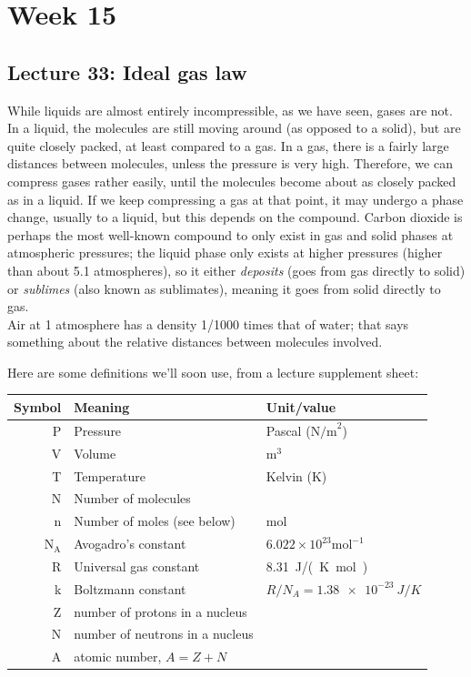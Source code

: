 \documentclass[8.01x]{subfiles}
\begin{document}
\chapter{Week 15}

\section{Lecture 33: Ideal gas law}

While liquids are almost entirely incompressible, as we have seen, gases are not. In a liquid, the molecules are still moving around (as opposed to a solid), but are quite closely packed, at least compared to a gas. In a gas, there is a fairly large distances between molecules, unless the pressure is very high. Therefore, we can compress gases rather easily, until the molecules become about as closely packed as in a liquid. If we keep compressing a gas at that point, it may undergo a phase change, usually to a liquid, but this depends on the compound. Carbon dioxide is perhaps the most well-known compound to only exist in gas and solid phases at atmospheric pressures; the liquid phase only exists at higher pressures (higher than about 5.1 atmospheres), so it either \emph{deposits} (goes from gas directly to solid) or \emph{sublimes} (also known as sublimates), meaning it goes from solid directly to gas.\\
Air at 1 atmosphere has a density 1/1000 times that of water; that says something about the relative distances between molecules involved.

Here are some definitions we'll soon use, from a lecture supplement sheet:

\begin{center}
\begin{tabular}{|r|l|l|}
\hline
Symbol & Meaning & Unit/value\\ \hline
P & Pressure & Pascal ($\text{N/m}^2$)\\
V & Volume & $\text{m}^3$\\
T & Temperature & Kelvin (K)\\
N & Number of molecules & \\
n & Number of moles (see below) & mol\\
$\text{N}_\text{A}$ & Avogadro's constant & $6.022 \times 10^{23} \text{mol}^{-1}$ \\
R & Universal gas constant & \SI{8.31}{J/(K mol)}\\
k & Boltzmann constant & $R/N_A = \SI{1.38e-23}{J/K}$\\
Z & number of protons in a nucleus & \\
N &  number of neutrons in a nucleus & \\
A & atomic number, $A = Z + N$ & \\ \hline
\end{tabular}
\end{center}
\end{document}

